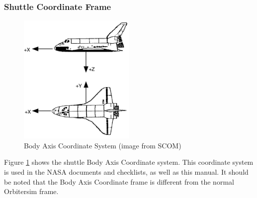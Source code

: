 \documentclass[13pt]{article}
\begin{document}
\begin{multicols*}{2}
\subsubsection{Shuttle Coordinate Frame}
\begin{figure}[H]
  \includegraphics[width=0.5\textwidth]{ShuttleBodyAxisSystem.png}
  \caption{Body Axis Coordinate System (image from SCOM)}
  \label{fig:BodyAxisSystem}
\end{figure}
Figure \ref{fig:BodyAxisSystem} shows the shuttle Body Axis Coordinate system. This coordinate system is used in the NASA documents and checklists, as well as this manual.
It should be noted that the Body Axis Coordinate frame is different from the normal Orbitersim frame.


\end{multicols*}
\end{document}
